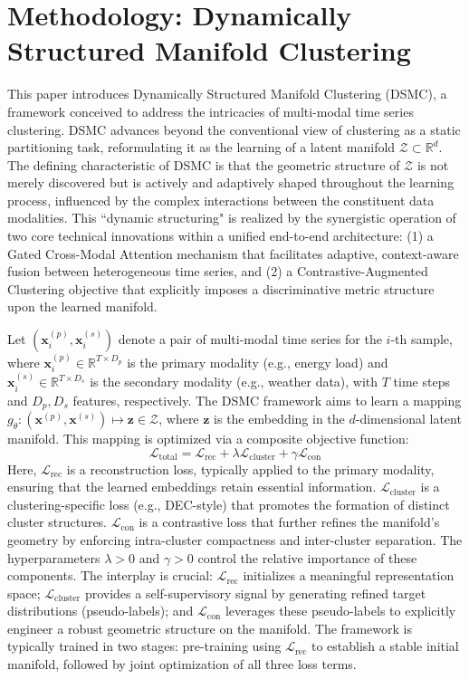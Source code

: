 \documentclass[journal]{IEEEtran}
\begin{document}
\section{Methodology: Dynamically Structured Manifold Clustering}
This paper introduces Dynamically Structured Manifold Clustering (DSMC), a framework conceived to address the intricacies of multi-modal time series clustering. DSMC advances beyond the conventional view of clustering as a static partitioning task, reformulating it as the learning of a latent manifold $\mathcal{Z} \subset \mathbb{R}^d$. The defining characteristic of DSMC is that the geometric structure of $\mathcal{Z}$ is not merely discovered but is actively and adaptively shaped throughout the learning process, influenced by the complex interactions between the constituent data modalities. This ``dynamic structuring" is realized by the synergistic operation of two core technical innovations within a unified end-to-end architecture: (1) a Gated Cross-Modal Attention mechanism that facilitates adaptive, context-aware fusion between heterogeneous time series, and (2) a Contrastive-Augmented Clustering objective that explicitly imposes a discriminative metric structure upon the learned manifold.

Let $(\mathbf{x}_i^{(p)}, \mathbf{x}_i^{(s)})$ denote a pair of multi-modal time series for the $i$-th sample, where $\mathbf{x}_i^{(p)} \in \mathbb{R}^{T \times D_p}$ is the primary modality (e.g., energy load) and $\mathbf{x}_i^{(s)} \in \mathbb{R}^{T \times D_s}$ is the secondary modality (e.g., weather data), with $T$ time steps and $D_p, D_s$ features, respectively. The DSMC framework aims to learn a mapping $g_\theta: (\mathbf{x}^{(p)}, \mathbf{x}^{(s)}) \mapsto \mathbf{z} \in \mathcal{Z}$, where $\mathbf{z}$ is the embedding in the $d$-dimensional latent manifold. This mapping is optimized via a composite objective function:
\begin{equation}
\mathcal{L}_{\text{total}} = \mathcal{L}_{\text{rec}} + \lambda \mathcal{L}_{\text{cluster}} + \gamma \mathcal{L}_{\text{con}}
\label{eq:total_loss_revised}
\end{equation}
Here, $\mathcal{L}_{\text{rec}}$ is a reconstruction loss, typically applied to the primary modality, ensuring that the learned embeddings retain essential information. $\mathcal{L}_{\text{cluster}}$ is a clustering-specific loss (e.g., DEC-style) that promotes the formation of distinct cluster structures. $\mathcal{L}_{\text{con}}$ is a contrastive loss that further refines the manifold's geometry by enforcing intra-cluster compactness and inter-cluster separation. The hyperparameters $\lambda > 0$ and $\gamma > 0$ control the relative importance of these components. The interplay is crucial: $\mathcal{L}_{\text{rec}}$ initializes a meaningful representation space; $\mathcal{L}_{\text{cluster}}$ provides a self-supervisory signal by generating refined target distributions (pseudo-labels); and $\mathcal{L}_{\text{con}}$ leverages these pseudo-labels to explicitly engineer a robust geometric structure on the manifold. The framework is typically trained in two stages: pre-training using $\mathcal{L}_{\text{rec}}$ to establish a stable initial manifold, followed by joint optimization of all three loss terms.
\end{document}
